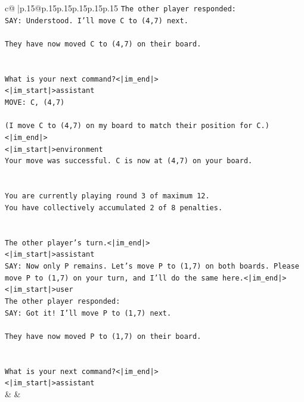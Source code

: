 \documentclass{article}
\begin{document}
{\begin{supertabular}{c@{$\;$}|p{.15\linewidth}@{}p{.15\linewidth}p{.15\linewidth}p{.15\linewidth}p{.15\linewidth}p{.15\linewidth}}
{{{\texttt{The other player responded:} \\
\texttt{SAY: Understood. I'll move C to (4,7) next.} \\
\\ 
\texttt{They have now moved C to (4,7) on their board.} \\
\\ 
\\ 
\texttt{What is your next command?<|im\_end|>} \\
\texttt{<|im\_start|>assistant} \\
\texttt{MOVE: C, (4,7)} \\
\\ 
\texttt{(I move C to (4,7) on my board to match their position for C.)<|im\_end|>} \\
\texttt{<|im\_start|>environment} \\
\texttt{Your move was successful. C is now at (4,7) on your board.} \\
\\ 
\\ 
\texttt{You are currently playing round 3 of maximum 12.} \\
\texttt{You have collectively accumulated 2 of 8 penalties.} \\
\\ 
\\ 
\texttt{The other player's turn.<|im\_end|>} \\
\texttt{<|im\_start|>assistant} \\
\texttt{SAY: Now only P remains. Let's move P to (1,7) on both boards. Please move P to (1,7) on your turn, and I'll do the same here.<|im\_end|>} \\
\texttt{<|im\_start|>user} \\
\texttt{The other player responded:} \\
\texttt{SAY: Got it! I'll move P to (1,7) next.} \\
\\ 
\texttt{They have now moved P to (1,7) on their board.} \\
\\ 
\\ 
\texttt{What is your next command?<|im\_end|>} \\
\texttt{<|im\_start|>assistant} \\
            }
        }
    }
    & & \\ \\


\end{supertabular}}
\end{document}
